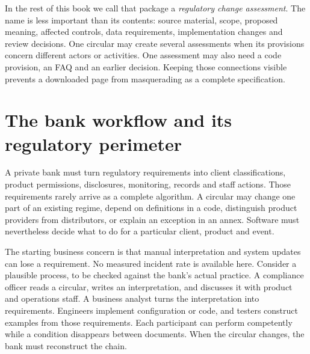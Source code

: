 In the rest of this book we call that package a \emph{regulatory change
assessment}. The name is less important than its contents: source material,
scope, proposed meaning, affected controls, data requirements, implementation
changes and review decisions. One circular may create several assessments when
its provisions concern different actors or activities. One assessment may also
need a code provision, an FAQ and an earlier decision. Keeping those connections
visible prevents a downloaded page from masquerading as a complete specification.



\section{The bank workflow and its regulatory perimeter}
\label{merge:P-01-problem:00}

\label{sec:problem}

A private bank must turn regulatory requirements into client classifications,
product permissions, disclosures, monitoring, records and staff actions. Those
requirements rarely arrive as a complete algorithm. A circular may change one
part of an existing regime, depend on definitions in a code, distinguish product
providers from distributors, or explain an exception in an annex. Software must
nevertheless decide what to do for a particular client, product and event.

The starting business concern is that manual interpretation and system updates
can lose a requirement. No measured incident rate is available here. Consider a
plausible process, to be checked against the bank's actual practice. A compliance
officer reads a circular,
writes an interpretation, and discusses it with product and operations staff. A
business analyst turns the interpretation into requirements. Engineers implement
configuration or code, and testers construct examples from those requirements.
Each participant can perform competently while a condition disappears between
documents. When the circular changes, the bank must reconstruct the chain.

